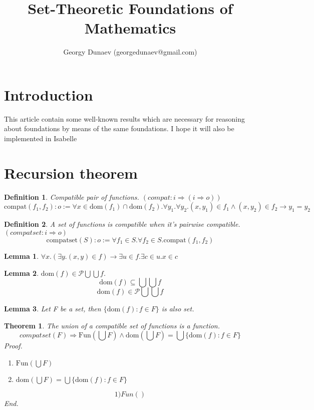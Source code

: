 \documentclass[10pt,a4paper]{article}
\author{Georgy Dunaev (georgedunaev@gmail.com)}
\title{%
Set-Theoretic Foundations of Mathematics}
\newtheorem{definition}{Definition}
\newtheorem{theorem}{Theorem}[section]
\newtheorem{lemma}{Lemma}
\newcommand{\dom}{\mbox{dom}}
\newcommand{\Fun}{\mbox{Fun}}
\newcommand{\compat}{\mbox{compat}}
\newcommand{\compatset}{\mbox{compatset}}
\newcommand{\Pow}{\mathcal{P}}
\newcommand{\Union}{\bigcup}
\begin{document}
\maketitle
\section{Introduction}
This article contain some well-known results which are necessary for reasoning about foundations by means of the same foundations. I hope it will also be implemented in Isabelle 
\section{Recursion theorem}
\begin{definition} Compatible pair of functions. $(compat : i \Rightarrow (i \Rightarrow o))$
\[
\compat(f_1,f_2) : o := \forall x \in \dom(f_1)\cap\dom(f_2). \forall y_1.\forall y_2. (x,y_1)\in f_1 \land  (x,y_2)\in f_2\rightarrow y_1=y_2 
\]
\end{definition}

\begin{definition} A set of functions is compatible when it's pairwise compatible. $(compatset : i \Rightarrow o)$
\[
\compatset(S) : o := \forall f_1\in S.\forall f_2\in S.\compat(f_1,f_2) 
\]
\end{definition}

\begin{lemma}
$\forall x. (\exists y.(x,y)\in f)\longrightarrow \exists u\in f.\exists c\in u.x\in c$
\end{lemma}

\begin{lemma}
$\dom(f)\in \Pow\Union\Union f$.
\[\dom(f)\subseteq \Union\Union f\]
\[\dom(f)\in \Pow\Union\Union f\]
\end{lemma}
\begin{lemma} Let F be a set, then $\{\dom(f) : f \in F \}$ is also set.

\end{lemma}
\begin{theorem}
The union of a compatible set of functions is a function. 
\[
compatset(F) \Longrightarrow \Fun(\bigcup F) \land \dom(\bigcup F) = \bigcup \{\dom(f) : f \in F\}
\]
Proof.
\begin{enumerate}
\item $\Fun(\bigcup F)$
\item $\dom(\bigcup F) = \bigcup \{\dom(f) : f \in F\}$
\end{enumerate}
\[1) Fun()\]
End.
\end{theorem}
\end{document}
